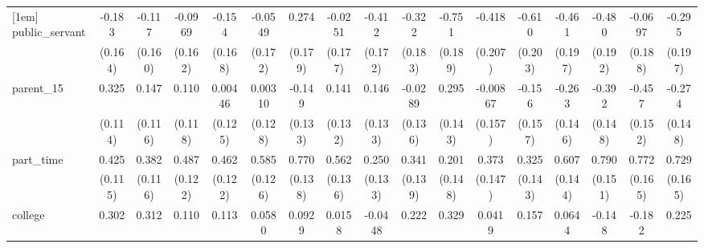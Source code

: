 {\begin{tabular}{l*{16}{c}}
[1em]
public\_servant      &      -0.183         &      -0.117         &     -0.0969         &      -0.154         &     -0.0549         &       0.274         &     -0.0251         &      -0.412\sym{*}  &      -0.322         &      -0.751\sym{***}&      -0.418\sym{*}  &      -0.610\sym{**} &      -0.461\sym{*}  &      -0.480\sym{*}  &     -0.0697         &      -0.295         \\
                    &     (0.164)         &     (0.160)         &     (0.162)         &     (0.168)         &     (0.172)         &     (0.179)         &     (0.177)         &     (0.172)         &     (0.183)         &     (0.189)         &     (0.207)         &     (0.203)         &     (0.197)         &     (0.192)         &     (0.188)         &     (0.197)         \\
[1em]
parent\_15           &       0.325\sym{**} &       0.147         &       0.110         &     0.00446         &     0.00310         &      -0.149         &       0.141         &       0.146         &     -0.0289         &       0.295\sym{*}  &    -0.00867         &      -0.156         &      -0.263         &      -0.392\sym{**} &      -0.457\sym{**} &      -0.274         \\
                    &     (0.114)         &     (0.116)         &     (0.118)         &     (0.125)         &     (0.128)         &     (0.133)         &     (0.132)         &     (0.133)         &     (0.136)         &     (0.143)         &     (0.157)         &     (0.157)         &     (0.146)         &     (0.148)         &     (0.152)         &     (0.148)         \\
[1em]
part\_time           &       0.425\sym{***}&       0.382\sym{**} &       0.487\sym{***}&       0.462\sym{***}&       0.585\sym{***}&       0.770\sym{***}&       0.562\sym{***}&       0.250         &       0.341\sym{*}  &       0.201         &       0.373\sym{*}  &       0.325\sym{*}  &       0.607\sym{***}&       0.790\sym{***}&       0.772\sym{***}&       0.729\sym{***}\\
                    &     (0.115)         &     (0.116)         &     (0.122)         &     (0.122)         &     (0.126)         &     (0.138)         &     (0.136)         &     (0.133)         &     (0.139)         &     (0.148)         &     (0.147)         &     (0.143)         &     (0.144)         &     (0.151)         &     (0.165)         &     (0.165)         \\
[1em]
college             &       0.302\sym{*}  &       0.312\sym{*}  &       0.110         &       0.113         &      0.0580         &      0.0929         &      0.0158         &     -0.0448         &       0.222         &       0.329\sym{*}  &      0.0419         &       0.157         &      0.0644         &      -0.148         &      -0.182         &       0.225         \\

\end{tabular}}
